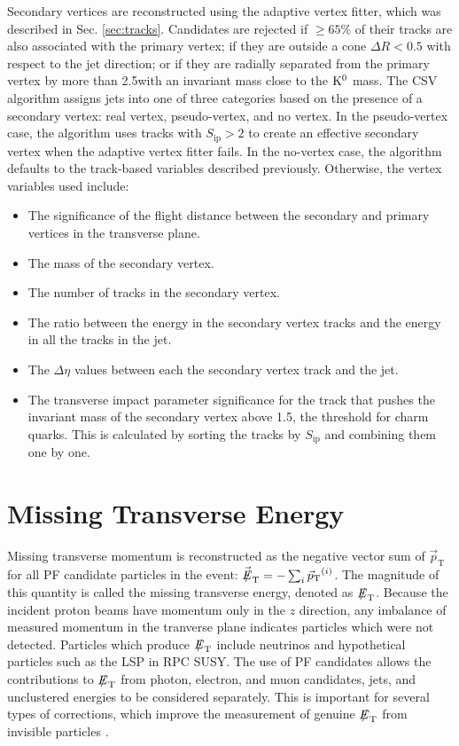 \documentclass[12pt]{thesis}  %
\def\eslash{\ensuremath{{\hbox{$E$\kern-0.6em\lower-.05ex\hbox{/}\kern0.10em}}}}
\def\vecmet{\mbox{$\vec{\eslash}_\text{T}$}\xspace} %
\def\vecpt{\mbox{$\vec{p}_\text{T}$}\xspace} %
\def\met{\mbox{$\eslash_\text{T}$}\xspace} %
\begin{document}
Secondary vertices are reconstructed using the adaptive vertex fitter, which was described in Sec. \ref{sec:tracks}. Candidates are rejected if ${\geq}65\%$ of their tracks are also associated with the primary vertex; if they are outside a cone $\Delta R < 0.5$ with respect to the jet direction; or if they are radially separated from the primary vertex by more than 2.5\cm with an invariant mass close to the $\mathrm{K}^{0}$ mass. The CSV algorithm assigns jets into one of three categories based on the presence of a secondary vertex: real vertex, pseudo-vertex, and no vertex. In the pseudo-vertex case, the algorithm uses tracks with $S_{\text{ip}} > 2$ to create an effective secondary vertex when the adaptive vertex fitter fails. In the no-vertex case, the algorithm defaults to the track-based variables described previously. Otherwise, the vertex variables used include:
\begin{itemize}
\item The significance of the flight distance between the secondary and primary vertices in the transverse plane.
\item The mass of the secondary vertex.
\item The number of tracks in the secondary vertex.
\item The ratio between the energy in the secondary vertex tracks and the energy in all the tracks in the jet.
\item The $\Delta\eta$ values between each the secondary vertex track and the jet.
\item The transverse impact parameter significance for the track that pushes the invariant mass of the secondary vertex above 1.5\GeVcc, the threshold for charm quarks. This is calculated by sorting the tracks by $S_{\text{ip}}$ and combining them one by one.
\end{itemize}

\section{Missing Transverse Energy
\label{sec:met}}

Missing transverse momentum is reconstructed as the negative vector sum of \vecpt for all PF candidate particles in the event: $\vecmet = - \sum_{i} \vecpt^{(i)}$. The magnitude of this quantity is called the missing transverse energy, denoted as \met. Because the incident proton beams have momentum only in the $z$ direction, any imbalance of measured momentum in the tranverse plane indicates particles which were not detected. Particles which produce \met include neutrinos and hypothetical particles such as the LSP in RPC SUSY. The use of PF candidates allows the contributions to \met from photon, electron, and muon candidates, jets, and unclustered energies to be considered separately. This is important for several types of corrections, which improve the measurement of genuine \met from invisible particles \cite{METperf2012}.
\end{document}
